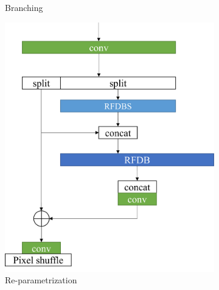 \documentclass[10pt,twocolumn,letterpaper]{article}
\begin{document}
\begin{figure}
\begin{subfigure}[b]{0.2476\linewidth}
        \caption{Branching}
        \label{fig:Branching}
    \end{subfigure}
    \begin{subfigure}[b]{0.246\linewidth}
		\centering
        \includegraphics[width=\textwidth]{../Re-parametrization.pdf}
        \caption{Re-parametrization}
        \label{fig:Re-parametrization}
    \end{subfigure}
    \begin{subfigure}[b]{0.246\linewidth}
		\centering

\end{subfigure}
\end{figure}
\end{document}
